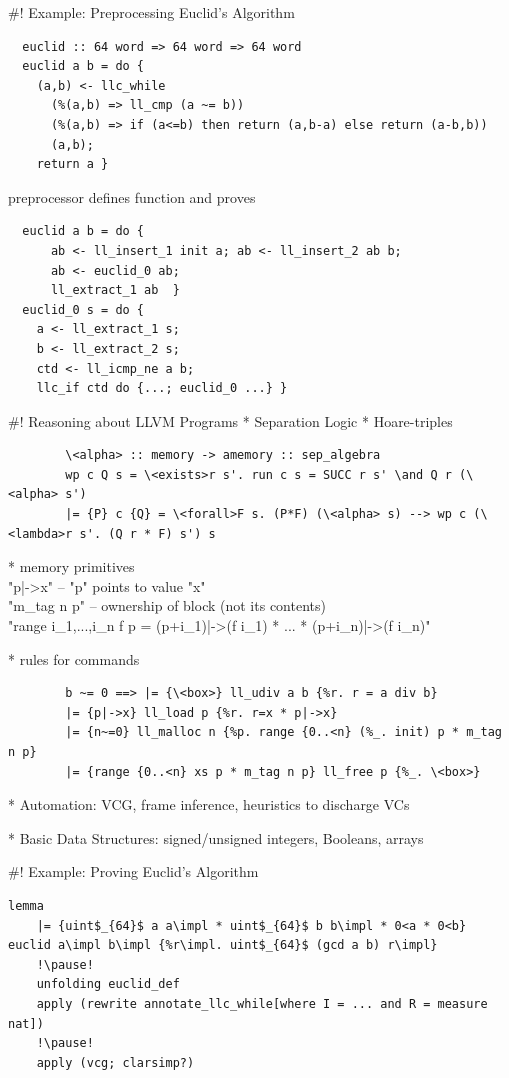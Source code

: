 \documentclass[fleqn]{beamer}
\begin{document}
#! Example: Preprocessing Euclid's Algorithm
  \small
  \begin{lstlisting}
  euclid :: 64 word => 64 word => 64 word
  euclid a b = do {
    (a,b) <- llc_while
      (%(a,b) => ll_cmp (a ~= b))
      (%(a,b) => if (a<=b) then return (a,b-a) else return (a-b,b))
      (a,b);
    return a }
  \end{lstlisting}
  \pause
  preprocessor defines function  and proves
  \begin{lstlisting}
  euclid a b = do {
      ab <- ll_insert_1 init a; ab <- ll_insert_2 ab b;
      ab <- euclid_0 ab;
      ll_extract_1 ab  }
  euclid_0 s = do {
    a <- ll_extract_1 s;
    b <- ll_extract_2 s;
    ctd <- ll_icmp_ne a b;
    llc_if ctd do {...; euclid_0 ...} }
  \end{lstlisting}

#! Reasoning about LLVM Programs
  * Separation Logic
    * Hoare-triples
      \begin{lstlisting}
        \<alpha> :: memory -> amemory :: sep_algebra
        wp c Q s = \<exists>r s'. run c s = SUCC r s' \and Q r (\<alpha> s')
        |= {P} c {Q} = \<forall>F s. (P*F) (\<alpha> s) --> wp c (\<lambda>r s'. (Q r * F) s') s
      \end{lstlisting}

    \pause
    * memory primitives\\
      \is"p|->x" -- \is"p" points to value \is"x"\\
      \is"m_tag n p" -- ownership of block (not its contents)\\[.5em]
      \is"range {i_1,...,i_n} f p = (p+i_1)|->(f i_1) * ... * (p+i_n)|->(f i_n)"

    \pause
    * rules for commands
      \begin{lstlisting}
        b ~= 0 ==> |= {\<box>} ll_udiv a b {%r. r = a div b}
        |= {p|->x} ll_load p {%r. r=x * p|->x}
        |= {n~=0} ll_malloc n {%p. range {0..<n} (%_. init) p * m_tag n p}
        |= {range {0..<n} xs p * m_tag n p} ll_free p {%_. \<box>}
      \end{lstlisting}

  \pause
  * Automation: VCG, frame inference, heuristics to discharge VCs

  \pause
  * Basic Data Structures: signed/unsigned integers, Booleans, arrays

#! Example: Proving Euclid's Algorithm
  \small
  \begin{lstlisting}[escapechar=!]
    lemma
    |= {uint$_{64}$ a a\impl * uint$_{64}$ b b\impl * 0<a * 0<b} euclid a\impl b\impl {%r\impl. uint$_{64}$ (gcd a b) r\impl}
    !\pause!
    unfolding euclid_def
    apply (rewrite annotate_llc_while[where I = ... and R = measure nat])
    !\pause!
    apply (vcg; clarsimp?)
  \end{lstlisting}
  \pause
\end{document}

